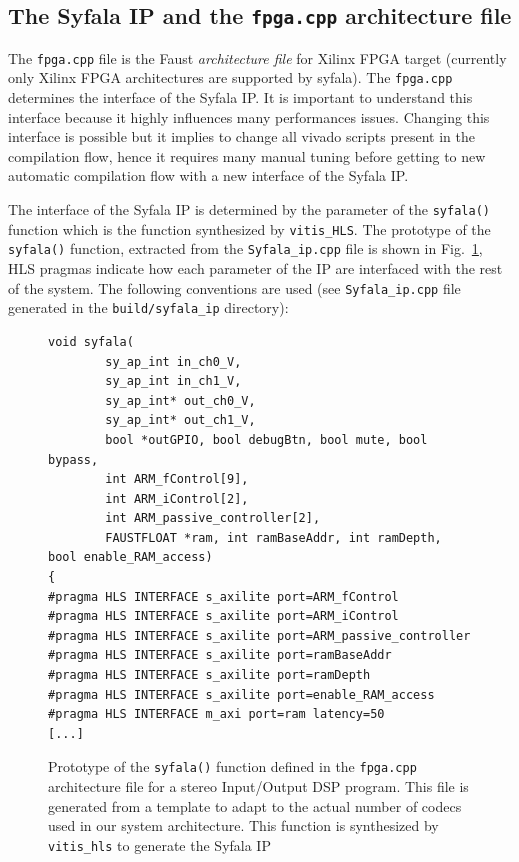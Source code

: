 \documentclass[11pt]{article}
\numberwithin{equation}{section}
\numberwithin{figure}{section}
\begin{document}
\subsection{The Syfala IP and the {\tt fpga.cpp} architecture file}
\label{sec:fpga}
The {\tt fpga.cpp} file is the Faust {\em architecture file} for Xilinx  FPGA target  (currently only Xilinx FPGA architectures are supported by syfala). The {\tt fpga.cpp} determines the interface of the Syfala IP. It is important to understand this interface because it highly influences many performances issues. Changing this interface is possible but it implies to change all vivado scripts present in the compilation flow, hence it requires many manual tuning before getting to new automatic compilation flow with a new interface of the Syfala IP. 

The interface of the Syfala IP is determined by the parameter of the {\tt syfala()} function which is the function synthesized by {\tt vitis\_HLS}. The prototype of the {\tt syfala()} function,  extracted from the {\tt Syfala\_ip.cpp} file is shown in Fig.~\ref{fig:interface}, HLS pragmas indicate how each parameter of the IP are interfaced with the rest of the system. The  following conventions are used (see {\tt Syfala\_ip.cpp} file generated in the {\tt build/syfala\_ip} directory):

\begin{figure}
\begin{boxedminipage}{\textwidth}
    \small
\begin{verbatim}
void syfala(
        sy_ap_int in_ch0_V,
        sy_ap_int in_ch1_V,
        sy_ap_int* out_ch0_V,
        sy_ap_int* out_ch1_V,
        bool *outGPIO, bool debugBtn, bool mute, bool bypass,
        int ARM_fControl[9],
        int ARM_iControl[2],
        int ARM_passive_controller[2],
        FAUSTFLOAT *ram, int ramBaseAddr, int ramDepth, bool enable_RAM_access)
{
#pragma HLS INTERFACE s_axilite port=ARM_fControl
#pragma HLS INTERFACE s_axilite port=ARM_iControl
#pragma HLS INTERFACE s_axilite port=ARM_passive_controller
#pragma HLS INTERFACE s_axilite port=ramBaseAddr
#pragma HLS INTERFACE s_axilite port=ramDepth
#pragma HLS INTERFACE s_axilite port=enable_RAM_access
#pragma HLS INTERFACE m_axi port=ram latency=50
[...]
\end{verbatim}
\end{boxedminipage}
\caption{Prototype of the {\tt syfala()} function defined in the {\tt fpga.cpp} architecture file for a stereo Input/Output DSP program. This file is generated from a template to adapt to the actual number of codecs used in our system architecture. This function is synthesized by {\tt vitis\_hls} to generate the Syfala IP}
\label{fig:interface}
\end{figure}
  
\end{document}
